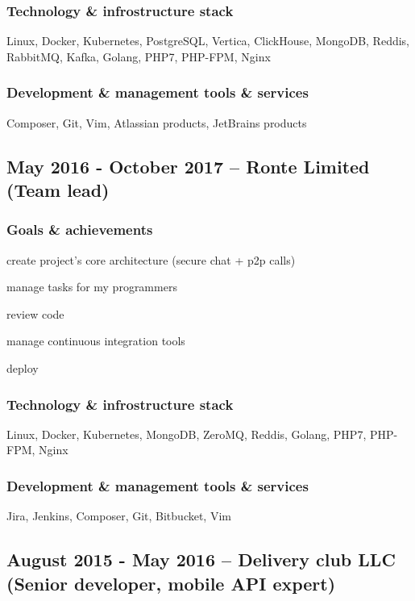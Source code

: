 \documentclass[9pt, a4paper, english]{extarticle}
\begin{document}
    \subsubsection* {Technology \& infrostructure stack}
      Linux, Docker, Kubernetes, PostgreSQL, Vertica, ClickHouse, MongoDB, Reddis, RabbitMQ, Kafka, Golang, PHP7, PHP-FPM, Nginx
    \subsubsection* {Development \& management tools \& services}
      Composer, Git, Vim, Atlassian products, JetBrains products


  \subsection* {May 2016 - October 2017 -- \textbf{Ronte Limited} (Team lead)}
    \subsubsection* {Goals \& achievements}
      \begin {list}{\textbullet}{\itemsep=0mm}
        \item create project's core architecture (secure chat + p2p calls)
        \item manage tasks for my programmers
        \item review code
        \item manage continuous integration tools
        \item deploy
      \end{list}
    \subsubsection* {Technology \& infrostructure stack}
      Linux, Docker, Kubernetes, MongoDB, ZeroMQ, Reddis, Golang, PHP7, PHP-FPM, Nginx
    \subsubsection* {Development \& management tools \& services}
      Jira, Jenkins, Composer, Git, Bitbucket, Vim


  \subsection* {August 2015 - May 2016 -- \textbf{Delivery club LLC} (Senior developer, mobile API expert)}
\end{document}
